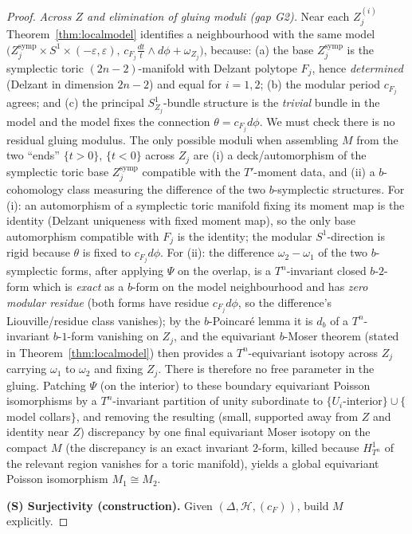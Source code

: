 \documentclass{amsart}
\theoremstyle{definition}
\begin{document}
\begin{proof}
\emph{Across $Z$ and elimination of gluing moduli (gap G2).} Near each
$Z_j^{(i)}$ Theorem~\ref{thm:localmodel} identifies a neighbourhood with the
same model $\bigl(Z_j^{\mathrm{symp}}\times S^1\times(-\varepsilon,\varepsilon),
\,c_{F_j}\tfrac{dt}{t}\wedge d\phi+\omega_{Z_j}\bigr)$, because: (a) the base
$Z_j^{\mathrm{symp}}$ is the symplectic toric $(2n-2)$-manifold with Delzant
polytope $F_j$, hence \emph{determined} (Delzant in dimension $2n-2$) and equal
for $i=1,2$; (b) the modular period $c_{F_j}$ agrees; and (c) the principal
$S^1_{Z_j}$-bundle structure is the \emph{trivial} bundle in the model and the
model fixes the connection $\theta=c_{F_j}d\phi$. We must check there is no
residual gluing modulus. The only possible moduli when assembling $M$ from the
two ``ends'' $\{t>0\}$, $\{t<0\}$ across $Z_j$ are (i) a deck/automorphism of
the symplectic toric base $Z_j^{\mathrm{symp}}$ compatible with the
$T'$-moment data, and (ii) a $b$-cohomology class measuring the difference of
the two $b$-symplectic structures. For (i): an automorphism of a symplectic
toric manifold fixing its moment map is the identity (Delzant uniqueness with
fixed moment map), so the only base automorphism compatible with $F_j$ is the
identity; the modular $S^1$-direction is rigid because $\theta$ is fixed to
$c_{F_j}d\phi$. For (ii): the difference $\omega_2-\omega_1$ of the two
$b$-symplectic forms, after applying $\Psi$ on the overlap, is a $T^n$-invariant
closed $b$-$2$-form which is \emph{exact} as a $b$-form on the model
neighbourhood and has \emph{zero modular residue} (both forms have residue
$c_{F_j}d\phi$, so the difference's Liouville/residue class vanishes); by the
$b$-Poincaré lemma it is $d_b$ of a $T^n$-invariant $b$-$1$-form vanishing on
$Z_j$, and the equivariant $b$-Moser theorem (stated in
Theorem~\ref{thm:localmodel}) then provides a $T^n$-equivariant isotopy across
$Z_j$ carrying $\omega_1$ to $\omega_2$ and fixing $Z_j$. There is therefore no
free parameter in the gluing. Patching $\Psi$ (on the interior) to these
boundary equivariant Poisson isomorphisms by a $T^n$-invariant partition of
unity subordinate to $\{U_i$-interior$\}\cup\{$model collars$\}$, and removing
the resulting (small, supported away from $Z$ and identity near $Z$) discrepancy
by one final equivariant Moser isotopy on the compact $M$ (the discrepancy is
an exact invariant $2$-form, killed because $H^1_{T^n}$ of the relevant region
vanishes for a toric manifold), yields a global equivariant Poisson isomorphism
$M_1\cong M_2$.

\medskip
\noindent\textbf{(S) Surjectivity (construction).}
Given $(\Delta,\mathcal H,(c_F))$, build $M$ explicitly.


\end{proof}
\end{document}
